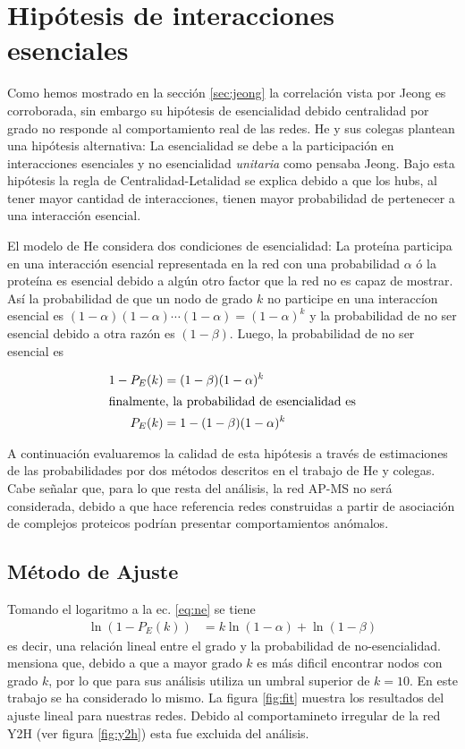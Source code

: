 \section{Hip\'otesis de interacciones esenciales~\citep{he2006}}
Como hemos mostrado en la secci\'on \ref{sec:jeong} la correlaci\'on vista por Jeong es corroborada, sin embargo su hip\'otesis
de esencialidad debido centralidad por grado no responde al comportamiento real de las redes. He y sus colegas plantean una
hip\'otesis alternativa: La esencialidad se debe a la participaci\'on en interacciones esenciales y no esencialidad 
\textit{unitaria} como pensaba Jeong. Bajo esta hip\'otesis la regla de Centralidad-Letalidad se explica debido a que 
los hubs, al tener mayor cantidad de interacciones, tienen mayor probabilidad de pertenecer a una interacci\'on esencial.

El modelo de He considera dos condiciones de esencialidad: La prote\'ina participa en una interacci\'on esencial representada
en la red con una probabilidad $\alpha$ \'o la prote\'ina es esencial debido a alg\'un otro factor que la red no es capaz de
mostrar. As\'i la probabilidad de que un nodo de grado $k$ no participe en una interacc\'ion esencial es 
$(1-\alpha)(1-\alpha)\cdots(1-\alpha) = (1-\alpha)^k$ y la probabilidad de no ser esencial debido a otra raz\'on es $(1-\beta)$.
Luego, la probabilidad de no ser esencial es

\begin{align}
    \label{eq:ne}
    1-P_E(k) &= (1-\beta)(1-\alpha)^k\\
    \intertext{finalmente, la probabilidad de esencialidad es}
    P_E(k) &= 1 - (1-\beta)(1-\alpha)^k
\end{align}


A continuaci\'on evaluaremos la calidad de esta hip\'otesis a trav\'es de estimaciones de las probabilidades por dos m\'etodos 
descritos en el trabajo de He y colegas. Cabe se\~nalar que, para lo que resta del an\'alisis, la red AP-MS no ser\'a considerada,
debido a que \citet{he2006} hace referencia redes construidas a partir de asociaci\'on de complejos proteicos podr\'ian 
presentar comportamientos an\'omalos.

\subsection{M\'etodo de Ajuste}
Tomando el logaritmo a la ec. \ref{eq:ne} se tiene 
\begin{align}
    \ln(1-P_E(k)) &= k \ln(1-\alpha) + \ln(1-\beta)
\end{align}
es decir, una relaci\'on lineal entre el grado y la probabilidad de no-esencialidad. \citet{he2006} mensiona que, debido a que
a mayor grado $k$ es m\'as dificil encontrar nodos con grado $k$, por lo que para sus an\'alisis utiliza un umbral superior de
$k=10$. En este trabajo se ha considerado lo mismo. La figura \ref{fig:fit} muestra los resultados del ajuste lineal para 
nuestras redes. Debido al comportamineto irregular de la red Y2H (ver figura \ref{fig:y2h}) esta fue excluida del an\'alisis.


